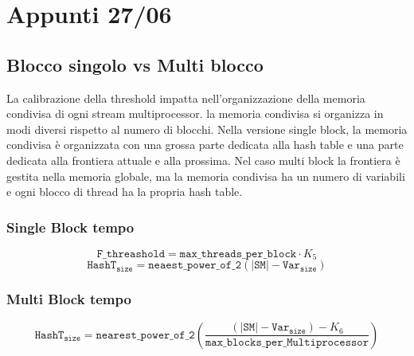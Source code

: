 \section{Appunti 27/06}

\subsection{Blocco singolo vs Multi blocco}
La calibrazione della threshold impatta nell'organizzazione della 
memoria condivisa di ogni stream multiprocessor.
la memoria condivisa si organizza in modi diversi rispetto 
al numero di blocchi.
Nella versione single block, la memoria condivisa è organizzata
con una grossa parte dedicata alla hash table e una parte dedicata 
alla frontiera attuale e alla prossima. Nel caso multi block
la frontiera è gestita nella memoria globale, ma la memoria condivisa
ha un numero di variabili e ogni blocco di thread ha la 
propria hash table.
\subsubsection{Single Block tempo}
\[
  \texttt{F\_threashold} = \texttt{max\_threads\_per\_block}
  \cdot K_5
\]
\[
\texttt{HashT}_{\texttt{size}} = 
\texttt{neaest\_power\_of\_2}(|\texttt{SM}| - \texttt{Var}_\texttt{size})
\]

\subsubsection{Multi Block tempo}
\[
  \texttt{HashT}_{\texttt{size}} =
  \texttt{nearest\_power\_of\_2}\left(
    \frac{(|\texttt{SM}| - \texttt{Var}_\texttt{size}) - K_6}{
      \texttt{max\_blocks\_per\_Multiprocessor}
    }\right)
\]

